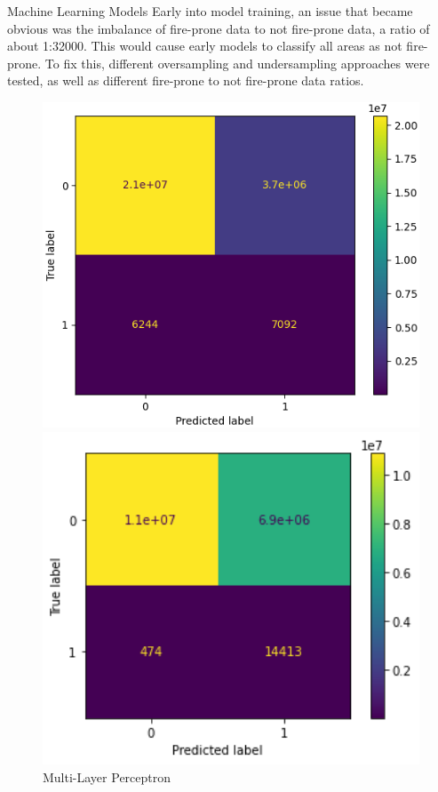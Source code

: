 \documentclass[final]{beamer}
\newlength{\colwidth}
\begin{document}
\begin{frame}[t]
\begin{columns}[t]
\begin{column}{\colwidth}
\begin{exampleblock}{Machine Learning Models}
    Early into model training, an issue that became obvious was the imbalance of fire-prone data to not fire-prone data, a ratio of about 1:32000. This would cause early models to classify all areas as not fire-prone. To fix this, different oversampling and undersampling approaches were tested, as well as different fire-prone to not fire-prone data ratios.
    \vspace{-1em}
    \begin{figure}
        \centering
        \begin{minipage}{0.5\textwidth}
            \centering
            \includegraphics[width=1\textwidth]{images/MLP.png}
            \caption{Multi-Layer Perceptron}
            \label{fig:CAEVI.png}
        \end{minipage}%
        \begin{minipage}{0.5\textwidth}
            \centering
            \includegraphics[width=1\textwidth]{images/GNB.png}

\end{minipage}
\end{figure}
\end{exampleblock}
\end{column}
\end{columns}
\end{frame}
\end{document}
